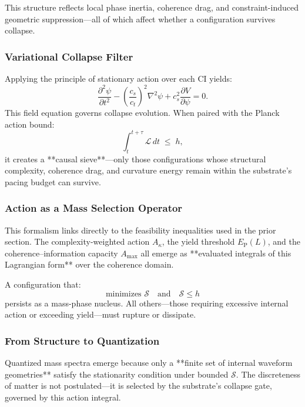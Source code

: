 \documentclass[preprints,article,submit,pdftex,moreauthors]{Definitions/mdpi}
\begin{document}
This structure reflects local phase inertia, coherence drag, and constraint-induced geometric suppression—all of which affect whether a configuration survives collapse.

\subsubsection*{Variational Collapse Filter}

Applying the principle of stationary action over each CI yields:
\begin{equation}
\frac{\partial^2 \psi}{\partial t^2} 
- \left(\frac{c_s}{c_t}\right)^2 \nabla^2 \psi 
+ c_s^2 \frac{\partial V}{\partial \psi} = 0.
\end{equation}
This field equation governs collapse evolution. When paired with the Planck action bound:
\begin{equation}
\int_{t}^{t+\tau} \mathcal{L}\, dt \;\leq\; h,
\end{equation}
it creates a **causal sieve**—only those configurations whose structural complexity, coherence drag, and curvature energy remain within the substrate’s pacing budget can survive.

\subsubsection*{Action as a Mass Selection Operator}

This formalism links directly to the feasibility inequalities used in the prior section. The complexity-weighted action \( A_\kappa \), the yield threshold \( E_{\mathrm{P}}(L) \), and the coherence–information capacity \( A_{\max} \) all emerge as **evaluated integrals of this Lagrangian form** over the coherence domain.

A configuration that:
\[
\text{minimizes } \mathcal{S} \quad \text{and} \quad \mathcal{S} \leq h
\]
persists as a mass-phase nucleus. All others—those requiring excessive internal action or exceeding yield—must rupture or dissipate.

\subsubsection*{From Structure to Quantization}

Quantized mass spectra emerge because only a **finite set of internal waveform geometries** satisfy the stationarity condition under bounded \( \mathcal{S} \). The discreteness of matter is not postulated—it is selected by the substrate’s collapse gate, governed by this action integral.
\end{document}
